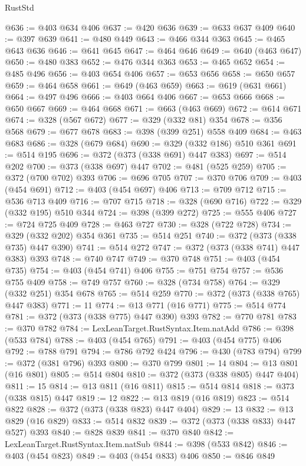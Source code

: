 \begin{lexlean}{RustStd}
\begin{coremodule}
@636 := @403 @634 @406
@637 := @420 @636
@639 := @633 @637 @409
@640 := @397 @639
@641 := @480 @449
@643 := @466 @344 @363
@645 := @465 @643 @636
@646 := @641 @645
@647 := @464 @646
@649 := @640 (@463 @647)
@650 := @480 @383
@652 := @476 @344 @363
@653 := @465 @652
@654 := @485 @496
@656 := @403 @654 @406
@657 := @653 @656
@658 := @650 @657
@659 := @464 @658
@661 := @649 (@463 @659)
@663 := @619 (@631 @661)
@664 := @497 @496
@666 := @403 @664 @406
@667 := @653 @666
@668 := @650 @667
@669 := @464 @668
@671 := @663 (@463 @669)
@672 := @614 @671
@674 := @328 (@567 @672)
@677 := @329 (@332 @81) @354
@678 := @356 @568
@679 := @677 @678
@683 := @398 (@399 @251) @558 @409
@684 := @463 @683
@686 := @328 (@679 @684)
@690 := @329 (@332 @186) @510 @361
@691 := @514 @195
@696 := @372 (@373 (@338 @691) @447 @383)
@697 := @514 @202
@700 := @373 (@338 @697) @447
@702 := @481 (@525 @259)
@705 := @372 (@700 @702) @393
@706 := @696 @705
@707 := @370 @706
@709 := @403 (@454 @691)
@712 := @403 (@454 @697) @406
@713 := @709 @712
@715 := @536 @713 @409
@716 := @707 @715
@718 := @328 (@690 @716)
@722 := @329 (@332 @195) @510 @344
@724 := @398 (@399 @272)
@725 := @555 @406
@727 := @724 @725 @409
@728 := @463 @727
@730 := @328 (@722 @728)
@734 := @329 (@332 @202) @354 @361
@735 := @514 @251
@740 := @372 (@373 (@338 @735) @447 @390)
@741 := @514 @272
@747 := @372 (@373 (@338 @741) @447 @383) @393
@748 := @740 @747
@749 := @370 @748
@751 := @403 (@454 @735)
@754 := @403 (@454 @741) @406
@755 := @751 @754
@757 := @536 @755 @409
@758 := @749 @757
@760 := @328 (@734 @758)
@764 := @329 (@332 @251) @354 @678
@765 := @514 @259
@770 := @372 (@373 (@338 @765) @447 @383)
@771 := 11
@774 := @13 @771 (@16 @771)
@775 := @514 @774
@781 := @372 (@373 (@338 @775) @447 @390) @393
@782 := @770 @781
@783 := @370 @782
@784 := LexLeanTarget.RustSyntax.Item.natAdd
@786 := @398 (@533 @784)
@788 := @403 (@454 @765)
@791 := @403 (@454 @775) @406
@792 := @788 @791
@794 := @786 @792 @424
@796 := @430 (@783 @794)
@799 := @372 (@381 @796) @393
@800 := @370 @799
@801 := 14
@804 := @13 @801 (@16 @801)
@805 := @514 @804
@810 := @372 (@373 (@338 @805) @447 @404)
@811 := 15
@814 := @13 @811 (@16 @811)
@815 := @514 @814
@818 := @373 (@338 @815) @447
@819 := 12
@822 := @13 @819 (@16 @819)
@823 := @514 @822
@828 := @372 (@373 (@338 @823) @447 @404)
@829 := 13
@832 := @13 @829 (@16 @829)
@833 := @514 @832
@839 := @372 (@373 (@338 @833) @447 @527) @393
@840 := @828 @839
@841 := @370 @840
@842 := LexLeanTarget.RustSyntax.Item.natSub
@844 := @398 (@533 @842)
@846 := @403 (@454 @823)
@849 := @403 (@454 @833) @406
@850 := @846 @849

\end{coremodule}
\end{lexlean}
